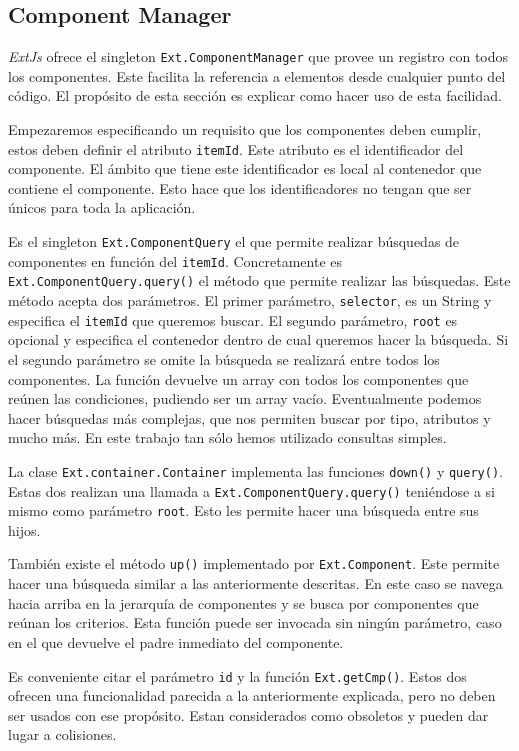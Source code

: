 	\subsection{Component Manager}
		\emph{ExtJs} ofrece el singleton \texttt{Ext.ComponentManager} que provee un registro con todos los componentes. Este facilita la referencia
		a elementos desde cualquier punto del código. El propósito de esta sección es explicar como hacer uso de esta facilidad.
		\par
		Empezaremos especificando un requisito que  los componentes deben cumplir, estos deben definir el atributo \texttt{itemId}. Este
		atributo es el identificador del componente. El ámbito que tiene este identificador es local al contenedor que contiene el componente.
		Esto hace que los identificadores no tengan que ser únicos para toda la aplicación. 
		\par
		Es el singleton \texttt{Ext.ComponentQuery} el que permite realizar búsquedas de componentes en función del \texttt{itemId}.
		Concretamente es \texttt{Ext.ComponentQuery.query()} el método que permite realizar las búsquedas. Este método acepta dos parámetros.
		El primer parámetro, \texttt{selector}, es un String y especifica el \texttt{itemId} que queremos buscar. El segundo parámetro,
		\texttt{root} es opcional y especifica el contenedor dentro de cual queremos hacer la búsqueda. Si el segundo parámetro se omite la
		búsqueda se realizará entre todos los componentes. La función devuelve un array con todos los componentes que reúnen las condiciones,
		pudiendo ser un array vacío. Eventualmente podemos hacer búsquedas más complejas, que nos permiten buscar por tipo, atributos y mucho
		más. En este trabajo tan sólo hemos utilizado consultas simples.
		\par
		La clase \texttt{Ext.container.Container} implementa las funciones \texttt{down()} y \texttt{query()}. Estas dos realizan una llamada
		a \texttt{Ext.ComponentQuery.query()} teniéndose a si mismo como parámetro \texttt{root}. Esto les permite hacer una búsqueda entre
		sus hijos.
		\par
		También existe el método \texttt{up()} implementado por \texttt{Ext.Component}. Este permite hacer una búsqueda similar a las
		anteriormente descritas. En este caso se navega hacia arriba en la jerarquía de componentes y se busca por componentes que reúnan los
		criterios. Esta función puede ser invocada sin ningún parámetro, caso en el que devuelve el padre inmediato del componente.
		\par
		Es conveniente citar el parámetro \texttt{id} y la función \texttt{Ext.getCmp()}. Estos dos ofrecen una funcionalidad parecida a la
		anteriormente explicada, pero no deben ser usados con ese propósito. Estan considerados como obsoletos y pueden dar lugar a
		colisiones. 
